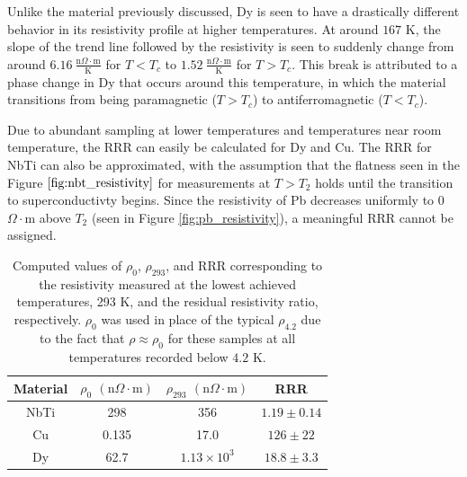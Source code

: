 \documentclass[prl,twocolumn,superscriptaddress,floatfix]{revtex4}
\begin{document}
Unlike the material previously discussed, Dy is seen to have a drastically different behavior in its resistivity profile at higher temperatures. At around $167$ K, the slope of the trend line followed by the resistivity is seen to suddenly change from around $6.16 \ \frac{\text{n} \Omega \cdot \text{m}}{\text{K}}$ for $T<T_c$ to $1.52 \ \frac{\text{n} \Omega \cdot \text{m}}{\text{K}}$ for $T>T_c$. This break is attributed to a phase change in Dy that occurs around this temperature, in which the material transitions from being  paramagnetic ($T>T_c$) to antiferromagnetic ($T<T_c$).

Due to abundant sampling at lower temperatures and temperatures near room temperature, the RRR can easily be calculated for Dy and Cu. The RRR for NbTi can also be approximated, with the assumption that the flatness seen in the Figure $\ref{fig:nbt_resistivity}$ for measurements at $T>T_2$ holds until the transition to superconductivty begins. Since the resistivity of Pb decreases uniformly to 0 $\Omega \cdot$m above $T_2$ (seen in Figure \ref{fig:pb_resistivity}), a meaningful RRR cannot be assigned.
\begin{table}[ht]
    \centering
    \begin{tabular}{|c|c|c|c|}
    \hline
    Material & $\rho_{0}$ $(\text{n} \Omega \cdot \text{m})$ & $\rho_{293}$ $(\text{n} \Omega \cdot \text{m})$ & RRR  \\ 
    \hline
    NbTi & 298 & 356 & $1.19 \pm 0.14$ \\
    \hline
    Cu & 0.135 & 17.0 & $126 \pm 22$ \\
    \hline
    Dy & 62.7 & $1.13 \times 10^{3}$ & $18.8 \pm 3.3$\\
    \hline
    \end{tabular}
    \caption{Computed values of $\rho_{0}$, $\rho_{293}$, and RRR corresponding to the resistivity measured at the lowest achieved temperatures, 293 K, and the residual resistivity ratio, respectively. $\rho_0$ was used in place of the typical $\rho_{4.2}$ due to the fact that $\rho\approx \rho_{0}$ for these samples at all temperatures recorded below $4.2$ K. }
    \label{tab:RRR}
\end{table}
\end{document}
